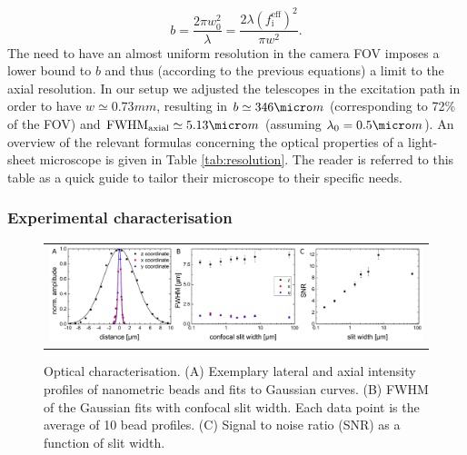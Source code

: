 \documentclass[12pt]{spieman}  %
\begin{document}
\begin{spacing}{2}
\begin{equation}
b = \frac{2\pi w_0^2}{\lambda} = \frac{2 \lambda  {(f_{\text{i}}^{\text{eff}})}^2}{\pi w^2}.
\end{equation}
The need to have an almost uniform resolution in the camera FOV imposes a lower bound to $b$ and thus (according to the previous equations) a limit to the axial resolution. In our setup we adjusted the telescopes in the excitation path in order to have $w \simeq 0.73 mm$, resulting in $b \simeq 346 \micro m$ (corresponding to 72\% of the FOV) and $\text{FWHM}_{\text{axial}} \simeq 5.13 \micro m$ (assuming $\lambda_0 = 0.5 \micro m$). An overview of the relevant formulas concerning the optical properties of a light-sheet microscope is given in Table \ref{tab:resolution}. The reader is referred to this table as a quick guide to tailor their microscope to their specific needs.

\subsubsection{Experimental characterisation}

\begin{figure}
   \begin{center}
   \begin{tabular}{c}
   \includegraphics[width=\textwidth]{frame3.eps}
   \end{tabular}
   \end{center}
   \caption{\label{fig:origin} Optical characterisation. (A) Exemplary lateral and axial intensity profiles of nanometric beads and fits to Gaussian curves. (B) FWHM of the Gaussian fits with confocal slit width. Each data point is the average of 10 bead profiles. (C) Signal to noise ratio (SNR) as a function of slit width.} 
\end{figure}


\end{spacing}
\end{document}
